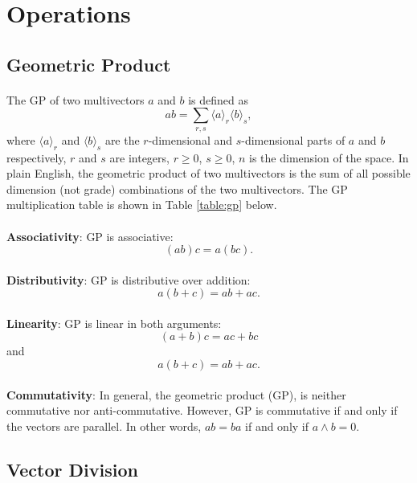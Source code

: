 \documentclass{article}
\begin{document}
\section{Operations}

\subsection{\textbf{Geometric Product}}

\paragraph{}
    The GP of two multivectors $a$ and $b$ is defined as $$ab = \sum_{r,s} \langle a \rangle_{r} \langle b \rangle_{s},$$
    where $\langle a \rangle_r$ and $\langle b \rangle_s$ are the $r$-dimensional and $s$-dimensional parts of $a$ and $b$
    respectively, $r$ and $s$ are integers, $r \geq 0$, $s \geq 0$, $n$ is the dimension of the space.
    In plain English, the geometric product of two multivectors is the sum of all possible dimension (not grade) 
    combinations of the two multivectors. The GP multiplication table is shown in Table \ref{table:gp} below.


\paragraph{}\textbf{Associativity}: GP is associative: $$(ab)c = a(bc).$$

\paragraph{}\textbf{Distributivity}: GP is distributive over addition: $$a(b+c) = ab + ac.$$

\paragraph{}\textbf{Linearity}: GP is linear in both arguments: 
$$(a+b)c = ac + bc$$ and $$a(b+c) = ab + ac.$$

\paragraph{}\textbf{Commutativity}: In general, the geometric product (GP), is neither commutative nor anti-commutative.
However, GP is commutative if and only if the vectors are parallel. 
In other words, $ab = ba$ if and only if $a \wedge b = 0$.

\subsection{\textbf{Vector Division}}
\end{document}
